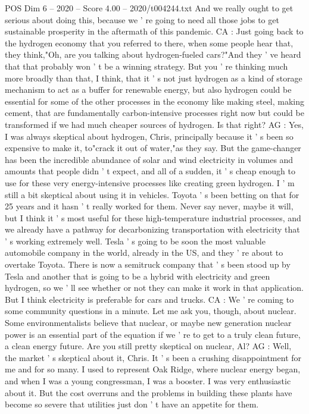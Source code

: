 \begin{textsample}{POS Dim 6 – 2020 – Score 4.00 – 2020/t004244.txt}
And we really ought to get serious about doing this, because we ' re going to need all those jobs to get sustainable prosperity in the aftermath of this pandemic.
CA : Just going back to the hydrogen economy that you referred to there, when some people hear that, they think,"Oh, are you talking about hydrogen-fueled cars?"And they ' ve heard that that probably won ' t be a winning strategy.
But you ' re thinking much more broadly than that, I think, that it ' s not just hydrogen as a kind of storage mechanism to act as a buffer for renewable energy, but also hydrogen could be essential for some of the other processes in the economy like making steel, making cement, that are fundamentally carbon-intensive processes right now but could be transformed if we had much cheaper sources of hydrogen.
Is that right?
AG : Yes, I was always skeptical about hydrogen, Chris, principally because it ' s been so expensive to make it, to"crack it out of water,"as they say.
But the game-changer has been the incredible abundance of solar and wind electricity in volumes and amounts that people didn ' t expect, and all of a sudden, it ' s cheap enough to use for these very energy-intensive processes like creating green hydrogen.
I ' m still a bit skeptical about using it in vehicles.
Toyota ' s been betting on that for 25 years and it hasn ' t really worked for them.
Never say never, maybe it will, but I think it ' s most useful for these high-temperature industrial processes, and we already have a pathway for decarbonizing transportation with electricity that ' s working extremely well.
Tesla ' s going to be soon the most valuable automobile company in the world, already in the US, and they ' re about to overtake Toyota.
There is now a semitruck company that ' s been stood up by Tesla and another that is going to be a hybrid with electricity and green hydrogen, so we ' ll see whether or not they can make it work in that application.
But I think electricity is preferable for cars and trucks.
CA : We ' re coming to some community questions in a minute.
Let me ask you, though, about nuclear.
Some environmentalists believe that nuclear, or maybe new generation nuclear power is an essential part of the equation if we ' re to get to a truly clean future, a clean energy future.
Are you still pretty skeptical on nuclear, Al?
AG : Well, the market ' s skeptical about it, Chris.
It ' s been a crushing disappointment for me and for so many.
I used to represent Oak Ridge, where nuclear energy began, and when I was a young congressman, I was a booster.
I was very enthusiastic about it.
But the cost overruns and the problems in building these plants have become so severe that utilities just don ' t have an appetite for them.

\end{textsample}

